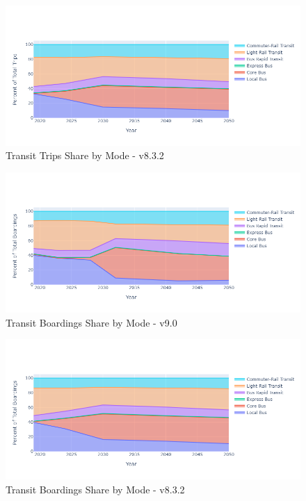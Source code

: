\documentclass[
  letterpaper,
  DIV=11,
  numbers=noendperiod,
  titlepage=false]{scrreprt}
\begin{document}
\begin{figure}[H]

{\centering \includegraphics{v9x/v900/whats-new/_pictures/pdf-shr-tr-all-832.png}

}

\caption{\label{fig-pdf-shr-tr-all-832}Transit Trips Share by Mode -
v8.3.2}

\end{figure}

\begin{figure}[H]

{\centering \includegraphics{v9x/v900/whats-new/_pictures/pdf-brd-9.png}

}

\caption{\label{fig-pdf-brd-9}Transit Boardings Share by Mode - v9.0}

\end{figure}

\begin{figure}[H]

{\centering \includegraphics{v9x/v900/whats-new/_pictures/pdf-brd-832.png}

}

\caption{\label{fig-pdf-brd-832}Transit Boardings Share by Mode -
v8.3.2}

\end{figure}
\end{document}
